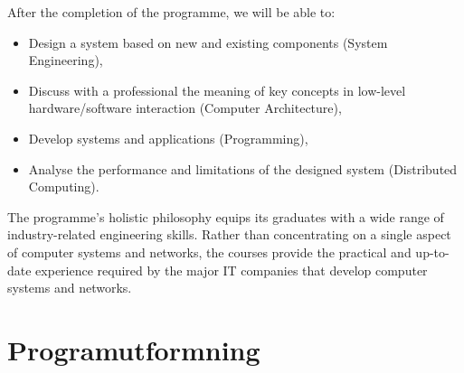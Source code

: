 \documentclass[twocolumn]{article}
\begin{document}
After the completion of the programme, we will be able to:
\begin{itemize}
\item Design a system based on new and existing components (System
  Engineering),
\item Discuss with a professional the meaning of key concepts in
  low-level hardware/software interaction (Computer Architecture),
\item Develop systems and applications (Programming),
\item Analyse the performance and limitations of the designed system
  (Distributed Computing).
\end{itemize}

The programme's holistic philosophy equips its graduates with a wide
range of industry-related engineering skills. Rather than
concentrating on a single aspect of computer systems and networks, the
courses provide the practical and up-to-date experience required by
the major IT companies that develop computer systems and networks.

\section{Programutformning}
\newcommand{\courselink}[2]{\href{https://www.student.chalmers.se/sp/course?course_id=#1}{#2}}

\newcommand{\introFP }{\courselink{16717}{Introduktion till funktionell programmering}}
\newcommand{\DiskMat }{\courselink{16714}{Inledande diskret matematik}}
\newcommand{\DigoDat }{\courselink{16012}{Digital- och  datorteknik}}
\newcommand{\LinAlg  }{\courselink{16376}{Linjär algebra}}
\newcommand{\MOP     }{\courselink{15446}{Maskinorienterad programmering}}
\newcommand{\MatAn   }{\courselink{15413}{Matematisk analys}}
\newcommand{\ElKrets }{\courselink{15353}{Elektriska kretsar och fält}}
\newcommand{\Barkraft}{\courselink{16340}{Bärkraftig resursanvändning}}

\newcommand{\OOP     }{\courselink{16190}{Objektorienterad programmering}}
\newcommand{\DStr    }{\courselink{16480}{Datastrukturer}}
\newcommand{\DigSynt }{\courselink{16419}{Digitalteknik-syntes}}
\newcommand{\DaSyTe  }{\courselink{15460}{Datorsystemteknik}}
\newcommand{\MaStDiMa}{\courselink{16511}{Matematisk statistik och diskret matematik}}
\newcommand{\FyIng   }{\courselink{16409}{Fysik för ingenjörer}}
\newcommand{\ParProg }{\courselink{15402}{Parallell programmering}}
\newcommand{\ProgPara}{\courselink{16828}{Programmerings\-paradigmer}}
\newcommand{\Datakom }{\courselink{16479}{Datakommunikation}}
\end{document}
